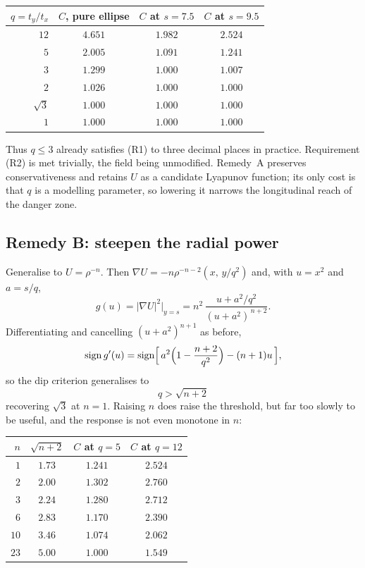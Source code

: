 \documentclass[11pt]{article}
\begin{document}
\begin{center}
\begin{tabular}{rccc}
\toprule
$q=t_{y}/t_{x}$ & $C$, pure ellipse & $C$ at $s=7.5$ & $C$ at $s=9.5$\\
\midrule
$12$        & $4.651$ & $1.982$ & $2.524$\\
$5$         & $2.005$ & $1.091$ & $1.241$\\
$3$         & $1.299$ & $1.000$ & $1.007$\\
$2$         & $1.026$ & $1.000$ & $1.000$\\
$\sqrt3$    & $1.000$ & $1.000$ & $1.000$\\
$1$         & $1.000$ & $1.000$ & $1.000$\\
\bottomrule
\end{tabular}
\end{center}

\noindent
Thus $q\le3$ already satisfies (R1) to three decimal places in practice.
Requirement (R2) is met trivially, the field being unmodified. Remedy~A
preserves conservativeness and retains $U$ as a candidate Lyapunov function;
its only cost is that $q$ is a modelling parameter, so lowering it narrows
the longitudinal reach of the danger zone.

\subsection{Remedy B: steepen the radial power}

Generalise to $U=\rho^{-n}$. Then $\nabla U=-n\rho^{-n-2}(x,\,y/q^{2})$ and,
with $u=x^{2}$ and $a=s/q$,
\begin{equation}
  g(u)=|\nabla U|^{2}\big|_{y=s}
      =n^{2}\,\frac{u+a^{2}/q^{2}}{(u+a^{2})^{\,n+2}} .
\end{equation}
Differentiating and cancelling $(u+a^{2})^{n+1}$ as before,
\begin{equation}
  \operatorname{sign}g'(u)
  =\operatorname{sign}\Bigl[\,a^{2}\Bigl(1-\frac{n+2}{q^{2}}\Bigr)-(n+1)u\,\Bigr],
\end{equation}
so the dip criterion generalises to
\begin{equation}
  \boxed{\;q>\sqrt{n+2}\;}
\end{equation}
recovering $\sqrt3$ at $n=1$. Raising $n$ does raise the threshold, but far
too slowly to be useful, and the response is not even monotone in $n$:

\begin{center}
\begin{tabular}{rccc}
\toprule
$n$ & $\sqrt{n+2}$ & $C$ at $q=5$ & $C$ at $q=12$\\
\midrule
$1$  & $1.73$ & $1.241$ & $2.524$\\
$2$  & $2.00$ & $1.302$ & $2.760$\\
$3$  & $2.24$ & $1.280$ & $2.712$\\
$6$  & $2.83$ & $1.170$ & $2.390$\\
$10$ & $3.46$ & $1.074$ & $2.062$\\
$23$ & $5.00$ & $1.000$ & $1.549$\\
\bottomrule
\end{tabular}
\end{center}
\end{document}

